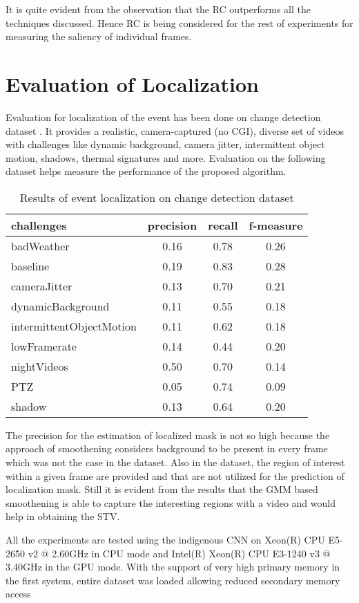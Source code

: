  It is quite evident from the observation that the RC outperforms all the techniques discussed. Hence RC is being considered for the rest of experiments  for measuring the saliency of individual frames.
\section{Evaluation of Localization}
Evaluation for localization of the event has been done on change detection dataset \citep{cdnet}. It provides  a realistic, camera-captured (no CGI), diverse set of videos with challenges  like dynamic background, camera jitter, intermittent object motion, shadows, thermal signatures and more. Evaluation on the following dataset helps measure the performance  of the proposed algorithm.
\begin{table}[htbp]
   \caption{Results of event localization on change detection dataset}
   \begin{center}
   \begin{tabular}{|l|c|c|c|} \hline
        challenges & precision & recall & f-measure \\ \hline
		badWeather & 0.16 & 0.78 & 0.26\\
		baseline & 0.19 & 0.83 & 0.28\\
		cameraJitter & 0.13 & 0.70 & 0.21 \\
		dynamicBackground & 0.11 & 0.55 &  0.18\\
		intermittentObjectMotion & 0.11 & 0.62 & 0.18 \\
		lowFramerate & 0.14 & 0.44 & 0.20 \\
		nightVideos & 0.50 & 0.70 & 0.14 \\
		PTZ & 0.05 & 0.74 & 0.09\\
		shadow & 0.13 & 0.64 & 0.20\\ \hline
   \end{tabular}
   \label{tab:salTwoObj}
   \end{center}
 \end{table} 
The precision for the estimation of localized mask is not so high because the approach of smoothening considers background to be present in every frame which was not the case in the dataset. Also in the dataset, the region of interest within a given frame are provided and that are not utilized for the prediction of localization mask. Still it is evident from the results that the GMM based smoothening is able to capture the interesting regions with a video and would help in obtaining the STV.

\par All the experiments are tested using the indigenous CNN on  Xeon(R) CPU E5-2650 v2 @ 2.60GHz in CPU mode and Intel(R) Xeon(R) CPU E3-1240 v3 @ 3.40GHz in the GPU mode. With the support of very high primary memory in  the first system, entire dataset was loaded allowing reduced secondary memory access

